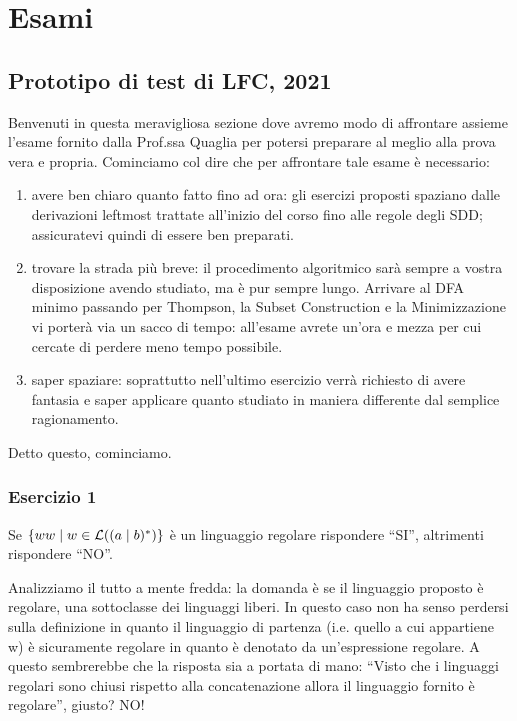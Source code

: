 \documentclass[class=book, crop=false, oneside, 12pt]{standalone}
\begin{document}
\chapter{Esami}
\section{Prototipo di test di LFC, 2021}


Benvenuti in questa meravigliosa sezione dove avremo modo di affrontare assieme l'esame fornito dalla Prof.ssa Quaglia per potersi preparare al meglio alla prova vera e propria. Cominciamo col dire che per affrontare tale esame è necessario:

\begin{enumerate}
    \item avere ben chiaro quanto fatto fino ad ora: gli esercizi proposti spaziano dalle derivazioni leftmost trattate all'inizio del corso fino alle regole degli SDD; assicuratevi quindi di essere ben preparati.
    \item trovare la strada più breve: il procedimento algoritmico sarà sempre a vostra disposizione avendo studiato, ma è pur sempre lungo. Arrivare al DFA minimo passando per Thompson, la Subset Construction e la Minimizzazione vi porterà via un sacco di tempo: all'esame avrete un'ora e mezza per cui cercate di perdere meno tempo possibile.
    \item saper spaziare: soprattutto nell'ultimo esercizio verrà richiesto di avere fantasia e saper applicare quanto studiato in maniera differente dal semplice ragionamento.
\end{enumerate}

Detto questo, cominciamo.

\subsection{Esercizio 1}

Se \(\{ww \mid w \in \mathcal{L}((a \mid b)^*)\}\) è un linguaggio regolare rispondere “SI”, altrimenti rispondere “NO”.

Analizziamo il tutto a mente fredda: la domanda è se il linguaggio proposto è regolare, una sottoclasse dei linguaggi liberi. In questo caso non ha senso perdersi sulla definizione in quanto il linguaggio di partenza (i.e. quello a cui appartiene w) è sicuramente regolare in quanto è denotato da un'espressione regolare. A questo sembrerebbe che la risposta sia a portata di mano: “Visto che i linguaggi regolari sono chiusi rispetto alla concatenazione allora il linguaggio fornito è regolare”, giusto? NO! 
\end{document}
